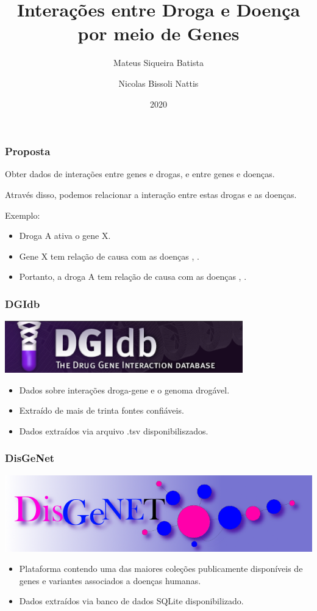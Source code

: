 \documentclass[12pt]{beamer}
\title{Interações entre Droga e Doença por meio de Genes}
\author{
  Mateus Siqueira Batista\and
  Nicolas Bissoli Nattis
}
\institute{
  MC536 - Instituto de Computação, UNICAMP
}
\date[2020]{2020}
\begin{document}
\frame{\titlepage}

\begin{frame}
  \frametitle{Proposta}
  Obter dados de interações entre genes e drogas, e entre genes e doenças.

  Através disso, podemos relacionar a interação entre estas drogas e as doenças.

  \begin{block}{Exemplo:}
    \begin{itemize}
      \item Droga A ativa o gene X.
      \item Gene X tem relação de causa com as doenças \textalpha, \textgamma.
      \item Portanto, a droga A tem relação de causa com as doenças \textalpha, \textgamma.
    \end{itemize}
  \end{block}
\end{frame}

\begin{frame}
  \frametitle{DGIdb}
  \centering
  \includegraphics[scale=0.5]{dgi}
  \vspace*{1 cm}
  \begin{itemize}
    \item Dados sobre interações droga-gene e o genoma drogável.
    \item Extraído de mais de trinta fontes confiáveis.
    \item Dados extraídos via arquivo .tsv disponibiliszados.
  \end{itemize}
\end{frame}

\begin{frame}
  \frametitle{DisGeNet}
  \centering
  \includegraphics[scale=0.25]{disgenet}
  \vspace*{1 cm}
  \begin{itemize}
    \item Plataforma contendo uma das maiores coleções publicamente disponíveis
          de genes e variantes associados a doenças humanas.
    \item Dados extraídos via banco de dados SQLite disponibilizado.
  \end{itemize}
\end{frame}
\end{document}
